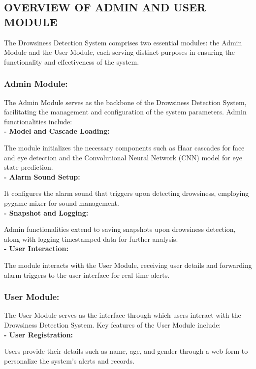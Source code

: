 \documentclass[12pt]{article}
\begin{document}
\subsection{OVERVIEW OF ADMIN AND USER MODULE}
The Drowsiness Detection System comprises two essential modules: the Admin Module and the User Module, each serving distinct purposes in ensuring the functionality and effectiveness of the system.
\subsubsection{Admin Module:}

The Admin Module serves as the backbone of the Drowsiness Detection System, facilitating the management and configuration of the system parameters. Admin functionalities include:\\

\textbf{- Model and Cascade Loading: }

The module initializes the necessary components such as Haar cascades for face and eye detection and the Convolutional Neural Network (CNN) model for eye state prediction.\\

\textbf{- Alarm Sound Setup: }

It configures the alarm sound that triggers upon detecting drowsiness, employing pygame mixer for sound management.\\

\textbf{- Snapshot and Logging:} 

Admin functionalities extend to saving snapshots upon drowsiness detection, along with logging timestamped data for further analysis.\\

\textbf{- User Interaction: }

The module interacts with the User Module, receiving user details and forwarding alarm triggers to the user interface for real-time alerts.\\

\subsubsection{User Module:}
The User Module serves as the interface through which users interact with the Drowsiness Detection System. Key features of the User Module include:\\

\textbf{- User Registration: }

Users provide their details such as name, age, and gender through a web form to personalize the system's alerts and records.\\
\end{document}
